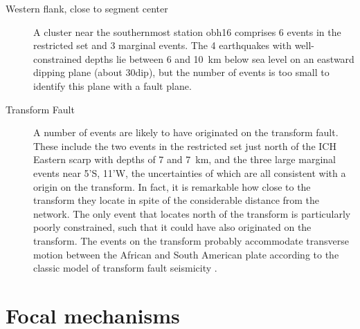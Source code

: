 \documentclass[jgr]{agu2001}
\newlength{\tw}
\begin{document}
\begin{article}
\begin{description}
\item[Western flank, close to segment center]
A cluster near the southernmost station obh16
comprises 6 events in the restricted set and 3 marginal events.
The 4 earthquakes with well-constrained depths lie between  6 and
10~km below sea level on an eastward
dipping plane (about 30\dg dip), but the number of events is too small to identify this
plane with a fault plane.

\item[Transform Fault]  A number of events are likely to have
originated on the transform fault.  These include the two events in the
restricted set just north of the ICH Eastern scarp with depths of
7 and 7~km, and the three
large marginal events near 5'S, 11'W, the uncertainties of
which are all consistent with a origin on the transform. In fact, it
is remarkable how close to the transform they locate in spite of  the
considerable distance from the network.  The only event that locates  north of the transform is
particularly poorly constrained, such that it could have also
originated on the transform.  The events on the transform probably
accommodate transverse motion between the African and South American
plate according to the classic model of transform fault seismicity \citep{sykes67}.
\end{description}

\section{Focal mechanisms}


\end{article}
\end{document}
